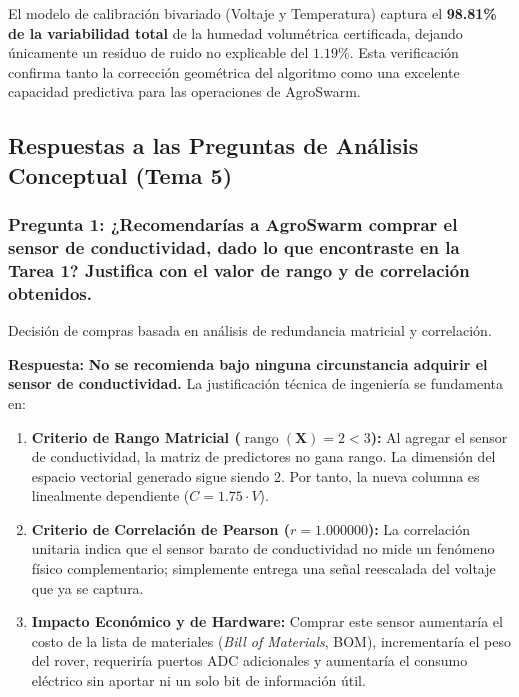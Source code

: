 \documentclass[12pt,a4paper]{article}
\newcommand{\rank}{\operatorname{rango}}
\begin{document}
\begin{pthreeSummary}
El modelo de calibración bivariado (Voltaje y Temperatura) captura el \textbf{98.81\% de la variabilidad total} de la humedad volumétrica certificada, dejando únicamente un residuo de ruido no explicable del $1.19\%$. Esta verificación confirma tanto la corrección geométrica del algoritmo como una excelente capacidad predictiva para las operaciones de AgroSwarm.
\end{pthreeSummary}

\newpage
\subsection{Respuestas a las Preguntas de Análisis Conceptual (Tema 5)}

\subsubsection*{Pregunta 1: ¿Recomendarías a AgroSwarm comprar el sensor de conductividad, dado lo que encontraste en la Tarea 1? Justifica con el valor de rango y de correlación obtenidos.}
\begin{pthreeProblem}
Decisión de compras basada en análisis de redundancia matricial y correlación.
\end{pthreeProblem}

\textbf{Respuesta:}
\textbf{No se recomienda bajo ninguna circunstancia adquirir el sensor de conductividad.} 
La justificación técnica de ingeniería se fundamenta en:
\begin{enumerate}[label={\color{p3blue}$\blacktriangleright$}]
  \item \textbf{Criterio de Rango Matricial ($\rank(\mathbf{X}) = 2 < 3$):} Al agregar el sensor de conductividad, la matriz de predictores no gana rango. La dimensión del espacio vectorial generado sigue siendo 2. Por tanto, la nueva columna es linealmente dependiente ($C = 1.75 \cdot V$).
  \item \textbf{Criterio de Correlación de Pearson ($r = 1.000000$):} La correlación unitaria indica que el sensor barato de conductividad no mide un fenómeno físico complementario; simplemente entrega una señal reescalada del voltaje que ya se captura.
  \item \textbf{Impacto Económico y de Hardware:} Comprar este sensor aumentaría el costo de la lista de materiales (\textit{Bill of Materials}, BOM), incrementaría el peso del rover, requeriría puertos ADC adicionales y aumentaría el consumo eléctrico sin aportar ni un solo bit de información útil.
\end{enumerate}
\end{document}
